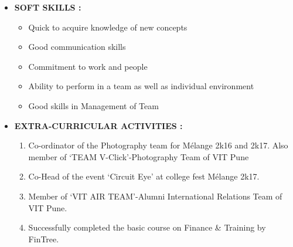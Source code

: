 \documentclass[11pt]{article}
\begin{document}
\begin{itemize}[label=$\star$]
\bigskip
\item	\begin{large} \textbf{SOFT SKILLS :} \end{large}
\begin{itemize}[label=$\bullet$]
	\item Quick to acquire knowledge of new concepts
	\item Good communication skills
	\item Commitment to work and people
	\item Ability to perform in a team as well as individual environment
	\item Good skills in Management of Team
\end{itemize}
	
\bigskip
\item	\begin{large} \textbf{EXTRA-CURRICULAR ACTIVITIES :} \end{large}
\begin{enumerate}
	\item Co-ordinator of the Photography team for Mélange 2k16 and 2k17. Also member of ‘TEAM V-Click’-Photography Team of VIT Pune
	\item Co-Head of the event ‘Circuit Eye’ at college fest Mélange 2k17. 
	\item Member of ‘VIT AIR TEAM’-Alumni International Relations Team of VIT Pune.
	\item Successfully completed the basic course on Finance \& Training by FinTree.
\end{enumerate}


\end{itemize}
\end{document}
